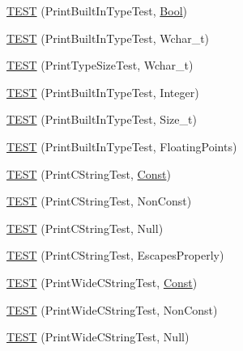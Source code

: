 \begin{DoxyCompactItemize}
\item 
\hyperlink{namespacetesting_1_1gtest__printers__test_a6f08c464dc0b8eb822368f552d4467ad}{T\+E\+ST} (Print\+Built\+In\+Type\+Test, \hyperlink{struct_bool}{Bool})
\item 
\hyperlink{namespacetesting_1_1gtest__printers__test_ab567ebd97eff0a4b9a20a5f5cb77d678}{T\+E\+ST} (Print\+Built\+In\+Type\+Test, Wchar\+\_\+t)
\item 
\hyperlink{namespacetesting_1_1gtest__printers__test_a705ec4c2886606a22194107397fceea6}{T\+E\+ST} (Print\+Type\+Size\+Test, Wchar\+\_\+t)
\item 
\hyperlink{namespacetesting_1_1gtest__printers__test_a278d53e99390c7b31ff531524fe5e86e}{T\+E\+ST} (Print\+Built\+In\+Type\+Test, Integer)
\item 
\hyperlink{namespacetesting_1_1gtest__printers__test_a991dc124d153742c3ca126b2fa9ccab5}{T\+E\+ST} (Print\+Built\+In\+Type\+Test, Size\+\_\+t)
\item 
\hyperlink{namespacetesting_1_1gtest__printers__test_acde0b28d177604ddb5e185d7b107f6f7}{T\+E\+ST} (Print\+Built\+In\+Type\+Test, Floating\+Points)
\item 
\hyperlink{namespacetesting_1_1gtest__printers__test_a6cd47b21ad8d9ac66ba57b5b6415a924}{T\+E\+ST} (Print\+C\+String\+Test, \hyperlink{namespacetesting_a945ac56c5508a3c9c032bbe8aae8dcfa}{Const})
\item 
\hyperlink{namespacetesting_1_1gtest__printers__test_a89d9905fecee1b976c26d35498734dd4}{T\+E\+ST} (Print\+C\+String\+Test, Non\+Const)
\item 
\hyperlink{namespacetesting_1_1gtest__printers__test_ad29b97d58a4d1e5e8dd4d854f66b9e22}{T\+E\+ST} (Print\+C\+String\+Test, Null)
\item 
\hyperlink{namespacetesting_1_1gtest__printers__test_a140030b990011abab91d4c0b59f21edd}{T\+E\+ST} (Print\+C\+String\+Test, Escapes\+Properly)
\item 
\hyperlink{namespacetesting_1_1gtest__printers__test_a4caa1f81979cdc6f5ada95e01a4fae63}{T\+E\+ST} (Print\+Wide\+C\+String\+Test, \hyperlink{namespacetesting_a945ac56c5508a3c9c032bbe8aae8dcfa}{Const})
\item 
\hyperlink{namespacetesting_1_1gtest__printers__test_a8812b5f088e13083ebb8a7e35fbcdae7}{T\+E\+ST} (Print\+Wide\+C\+String\+Test, Non\+Const)
\item 
\hyperlink{namespacetesting_1_1gtest__printers__test_acd1267d49d61ad53b2b8a88f68fca3a7}{T\+E\+ST} (Print\+Wide\+C\+String\+Test, Null)
\item 

\end{DoxyCompactItemize}
